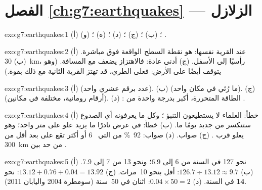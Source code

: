\section*{الفصل \ref{ch:g7:earthquakes} --- الزلازل}

\begin{solution}{exo:g7:earthquakes:1}
(أ) ؛ (ب) ؛ (ج) ؛ (د) ؛ (ه) ؛ (و)
.
\end{solution}

\begin{solution}{exo:g7:earthquakes:2}
(أ) عند القرية نفسها:  هو نقطة السطح الواقعة فوق 
مباشرة. (ب) \qty{30}{km}، رأسيًا إلى الأسفل. (ج) أدنى عادة: فالاهتزاز يضعف
مع المسافة. (وهو يتوقف أيضًا على الأرض: فعلى  الطري، قد تهتز القرية
الثانية مع ذلك بقوة.)
\end{solution}

\begin{solution}{exo:g7:earthquakes:3}
(أ)  (عدد برقم عشري واحد). (ب)  (ما رُئي في مكان واحد). (ج) 
(أرقام رومانية، مختلفة في مكانين). (د) : الطاقة المتحررة، أكبر بدرجة
واحدة من .
\end{solution}

\begin{solution}{exo:g7:earthquakes:4}
(أ) خطأ: العلماء لا يستطيعون التنبؤ ؛ وكل ما يعرفونه أي الصدوع
ستنكسر من جديد يومًا ما. (ب) خطأ: في عرض  نادرًا ما يزيد علو 
على متر واحد؛ وهو يعلو قرب . (ج) صواب. (د) صواب: 92~\% من  التي
~6 أو أكثر تقع على بعد أقل من \qty{300}{km} من حد بين .
\end{solution}

\begin{solution}{exo:g7:earthquakes:5}
(أ) نحو 127 في السنة  من 6 إلى 6.9؛ ونحو 13  من 7 إلى 7.9.
(ب) $126.7 \div 13.12 \approx 9.7$: أقل بنحو 10~مرات. (ج)
$13.12 + 0.76 + 0.04 = 13.92$: نحو \textbf{14} في السنة. (د)
$0.04 \times 50 = 2$: اثنان في 50~سنة (سومطرة 2004 واليابان 2011).
\end{solution}

